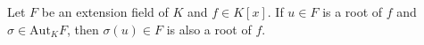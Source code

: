 Let $F$ be an extension field of $K$ and $f \in K[x]$. If $u \in F$ is a root of $f$ and $\sigma \in \mathrm{Aut}_K F$, then $\sigma(u) \in F$ is also a root of $f$.
